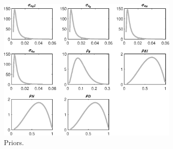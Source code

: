  
\begin{figure}[H]
\centering
\includegraphics[width=0.80\textwidth]{BRS_growth_alt/graphs/BRS_growth_alt_Priors1}
\caption{Priors.}\label{Fig:Priors:1}
\end{figure}
 
